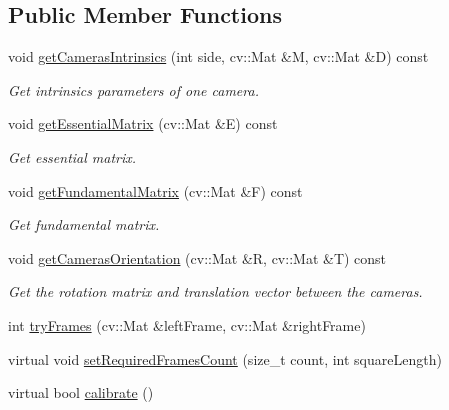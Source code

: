 \subsection*{Public Member Functions}
\begin{DoxyCompactItemize}
\item 
\hypertarget{classVStereoCalibrator_a99cf01815e1a586f39f3da5d8d37848f}{
void \hyperlink{classVStereoCalibrator_a99cf01815e1a586f39f3da5d8d37848f}{getCamerasIntrinsics} (int side, cv::Mat \&M, cv::Mat \&D) const }
\label{classVStereoCalibrator_a99cf01815e1a586f39f3da5d8d37848f}

\begin{DoxyCompactList}\small\item\em Get intrinsics parameters of one camera. \item\end{DoxyCompactList}\item 
\hypertarget{classVStereoCalibrator_a00919cac74070cd925bfe8e05046a44a}{
void \hyperlink{classVStereoCalibrator_a00919cac74070cd925bfe8e05046a44a}{getEssentialMatrix} (cv::Mat \&E) const }
\label{classVStereoCalibrator_a00919cac74070cd925bfe8e05046a44a}

\begin{DoxyCompactList}\small\item\em Get essential matrix. \item\end{DoxyCompactList}\item 
\hypertarget{classVStereoCalibrator_aebd902a53410b7a9a4df570fcd5245c0}{
void \hyperlink{classVStereoCalibrator_aebd902a53410b7a9a4df570fcd5245c0}{getFundamentalMatrix} (cv::Mat \&F) const }
\label{classVStereoCalibrator_aebd902a53410b7a9a4df570fcd5245c0}

\begin{DoxyCompactList}\small\item\em Get fundamental matrix. \item\end{DoxyCompactList}\item 
\hypertarget{classVStereoCalibrator_a4d61328f70d43a5414f5e9a53ffd642b}{
void \hyperlink{classVStereoCalibrator_a4d61328f70d43a5414f5e9a53ffd642b}{getCamerasOrientation} (cv::Mat \&R, cv::Mat \&T) const }
\label{classVStereoCalibrator_a4d61328f70d43a5414f5e9a53ffd642b}

\begin{DoxyCompactList}\small\item\em Get the rotation matrix and translation vector between the cameras. \item\end{DoxyCompactList}\item 
int \hyperlink{classVStereoCalibrator_ac080bd54496fef9b9e115944ddc3ca34}{tryFrames} (cv::Mat \&leftFrame, cv::Mat \&rightFrame)
\item 
virtual void \hyperlink{classVStereoCalibrator_a48004bae492ead13c14f0810b74bc4d0}{setRequiredFramesCount} (size\_\-t count, int squareLength)
\item 
virtual bool \hyperlink{classVStereoCalibrator_a7754bdddf997110220fedb2a222001ee}{calibrate} ()
\end{DoxyCompactItemize}


